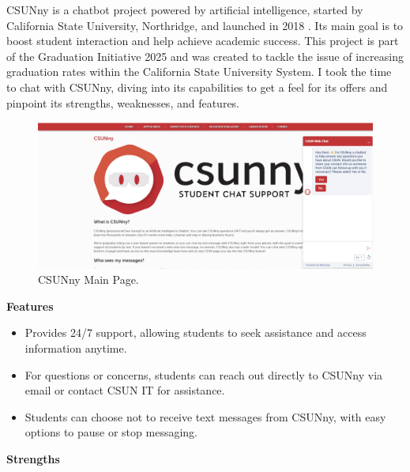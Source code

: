 \documentclass{l4proj}
\begin{document}
CSUNny is a chatbot project powered by artificial intelligence, started by California State University, Northridge, and launched in 2018 \citep{csunCSUNny}. Its main goal is to boost student interaction and help achieve academic success. This project is part of the Graduation Initiative 2025 and was created to tackle the issue of increasing graduation rates within the California State University System. I took the time to chat with CSUNny, diving into its capabilities to get a feel for its offers and pinpoint its strengths, weaknesses, and features.

\begin{figure}[h!]
  \centering
  \begin{adjustbox}{center,max height=0.24\textheight, max width=\linewidth}
    \includegraphics{images/csunny.png}
  \end{adjustbox}
  \caption{CSUNny Main Page.}
\end{figure}



\textbf{Features}

\begin{itemize}

    \item Provides 24/7 support, allowing students to seek assistance and access information anytime.

    \item For questions or concerns, students can reach out directly to CSUNny via email or contact CSUN IT for assistance.

    \item Students can choose not to receive text messages from CSUNny, with easy options to pause or stop messaging.
\end{itemize}

\textbf{Strengths}
\end{document}
